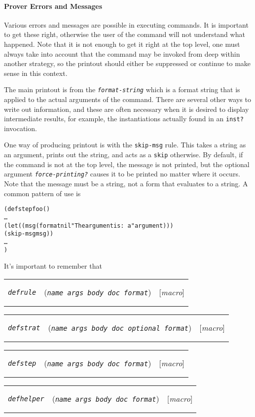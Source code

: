 \documentclass[12pt]{book}
\makeatletter
\def\ampoptional{{\smaller\sc {\smaller\smaller \&}optional\ }}
\newenvironment{function}[3]%
{\par\noindent\begin{boxedminipage}{\textwidth}%
 \par\noindent\begin{tabularx}{\linewidth}{l>{\raggedright}Xr}%
 \functionhtgt{#1}&(\texttt{\textit{#2}})&[\emph{#3}]%
 \end{tabularx}\par\flushright\begin{minipage}{.97\textwidth}}
{\end{minipage}\end{boxedminipage}}
\newcommand{\functionarg}[1]{\texttt{\textit{#1}}}
\newcommand{\functionnm}[1]{\texttt{\textit{#1}}}
\newcommand{\functionhtgt}[1]{\hypertarget{#1}{\functionnm{#1}}\index{#1@\functionnm{#1}|underline}}
\newenvironment{macro}[2]%
{\begin{function}{#1}{#2}{macro}}{\end{function}}
\makeatother
\begin{document}
\paragraph{Prover Errors and Messages}

Various errors and messages are possible in executing commands.  It is
important to get these right, otherwise the user of the command will not
understand what happened.  Note that it is not enough to get it right at
the top level, one must always take into account that the command may be
invoked from deep within another strategy, so the printout should either
be suppressed or continue to make sense in this context.

The main printout is from the \functionarg{format-string} which is a
format string that is applied to the actual arguments of the command.
There are several other ways to write out information, and these are often
necessary when it is desired to display intermediate results, for example,
the instantiations actually found in an \texttt{inst?} invocation.

One way of producing printout is with the \texttt{skip-msg} rule.  This
takes a string as an argument, prints out the string, and acts as a
\texttt{skip} otherwise.  By default, if the command is not at the top
level, the message is not printed, but the optional argument
\functionarg{force-printing?} causes it to be printed no matter where it
occurs.  Note that the message must be a string, not a form that evaluates
to a string.  A common pattern of use is
\begin{alltt}
  (defstep foo ()
    \ldots
    (let ((msg (format nil "The argument is: ~a" argument)))
      (skip-msg msg))
    \ldots
  )
\end{alltt}
It's important to remember that 

\begin{macro}{defrule}{name args body doc format}
\end{macro}

\begin{macro}{defstrat}{name args body doc \ampoptional format}
\end{macro}

\begin{macro}{defstep}{name args body doc format}
\end{macro}

\begin{macro}{defhelper}{name args body doc format}
\end{macro}
\end{document}
